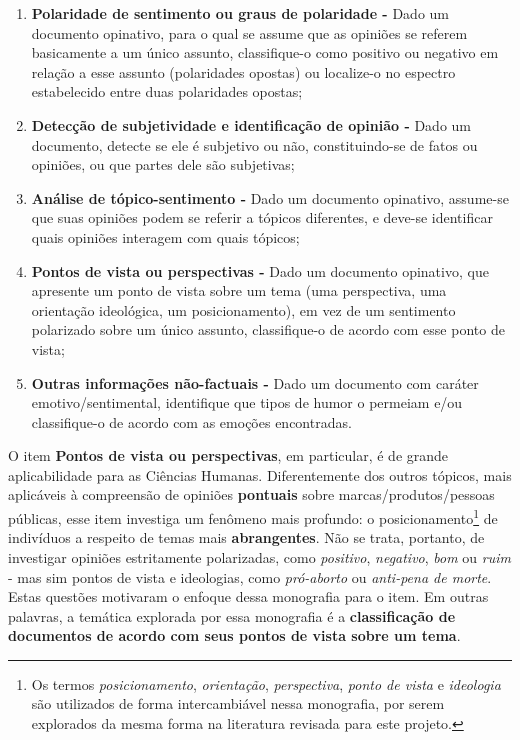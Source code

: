 \begin{enumerate}
    \item \textbf{Polaridade de sentimento ou graus de polaridade -} Dado um documento opinativo, para o qual se assume que as opiniões se referem basicamente a um único assunto, classifique-o como positivo ou negativo em relação a esse assunto (polaridades opostas) ou localize-o no espectro estabelecido entre duas polaridades opostas;
    \item \textbf{Detecção de subjetividade e identificação de opinião -} Dado um documento, detecte se ele é subjetivo ou não, constituindo-se de fatos ou opiniões, ou que partes dele são subjetivas;
    \item \textbf{Análise de tópico-sentimento -} Dado um documento opinativo, assume-se que suas opiniões podem se referir a tópicos diferentes, e deve-se identificar quais opiniões interagem com quais tópicos;
   \item \textbf{Pontos de vista ou perspectivas -} Dado um documento opinativo, que apresente um ponto de vista sobre um tema (uma perspectiva, uma orientação ideológica, um posicionamento), em vez de um sentimento polarizado sobre um único assunto, classifique-o de acordo com esse ponto de vista;
   \item \textbf{Outras informações não-factuais -} Dado um documento com caráter emotivo/sentimental, identifique que tipos de humor o permeiam e/ou classifique-o de acordo com as emoções encontradas.

\end{enumerate}

O item \textbf{Pontos de vista ou perspectivas}, em particular, é de grande aplicabilidade para as Ciências Humanas. Diferentemente dos outros tópicos, mais aplicáveis à compreensão de opiniões \textbf{pontuais} sobre marcas/produtos/pessoas públicas, esse item investiga um fenômeno mais profundo: o posicionamento\footnote{Os termos \emph{posicionamento}, \emph{orientação}, \emph{perspectiva}, \emph{ponto de vista} e \emph{ideologia} são utilizados de forma intercambiável nessa monografia, por serem explorados da mesma forma na literatura revisada para este projeto.} de indivíduos a respeito de temas mais \textbf{abrangentes}. Não se trata, portanto, de investigar opiniões estritamente polarizadas, como \emph{positivo}, \emph{negativo}, \emph{bom} ou \emph{ruim} - mas sim pontos de vista e ideologias, como \emph{pró-aborto} ou \emph{anti-pena de morte}. Estas questões motivaram o enfoque dessa monografia para o item. Em outras palavras, a temática explorada por essa monografia é a \textbf{classificação de documentos de acordo com seus pontos de vista sobre um tema}.

